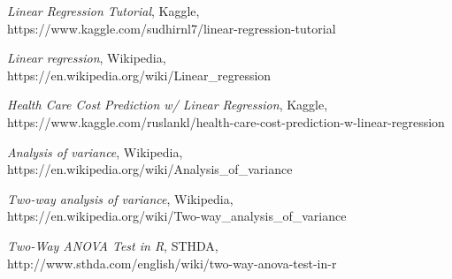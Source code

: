\documentclass[a4paper]{article}
\begin{document}
\begin{thebibliography}{80}

{\em  Linear Regression Tutorial}, Kaggle,\\ 
{\color{blue}https://www.kaggle.com/sudhirnl7/linear-regression-tutorial}

{\em Linear regression}, Wikipedia,\\
{\color{blue}https://en.wikipedia.org/wiki/Linear\_regression}

{\em Health Care Cost Prediction w/ Linear Regression}, Kaggle,\\
{\color{blue}https://www.kaggle.com/ruslankl/health-care-cost-prediction-w-linear-regression}

{\em Analysis of variance}, Wikipedia,\\
{\color{blue}https://en.wikipedia.org/wiki/Analysis\_of\_variance}

{\em Two-way analysis of variance}, Wikipedia,\\
{\color{blue}https://en.wikipedia.org/wiki/Two-way\_analysis\_of\_variance}

{\em Two-Way ANOVA Test in R}, STHDA,\\
{\color{blue}http://www.sthda.com/english/wiki/two-way-anova-test-in-r}
\end{thebibliography}   
\end{document}
